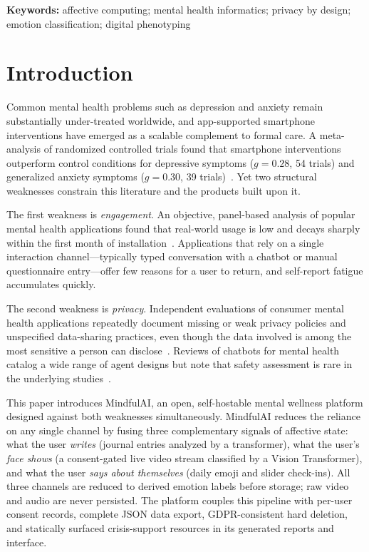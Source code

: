 \documentclass[11pt,a4paper]{article}
\newcommand{\system}{MindfulAI}
\begin{document}
\vspace{4pt}
\noindent\textbf{Keywords:} affective computing; mental health informatics; privacy by design; emotion classification; digital phenotyping

\vspace{6pt}

\section{Introduction}\label{sec:intro}

Common mental health problems such as depression and anxiety remain substantially under-treated worldwide, and app-supported smartphone interventions have emerged as a scalable complement to formal care. A meta-analysis of randomized controlled trials found that smartphone interventions outperform control conditions for depressive symptoms ($g = 0.28$, 54 trials) and generalized anxiety symptoms ($g = 0.30$, 39 trials)~\cite{linardon2019}. Yet two structural weaknesses constrain this literature and the products built upon it.

The first weakness is \emph{engagement}. An objective, panel-based analysis of popular mental health applications found that real-world usage is low and decays sharply within the first month of installation~\cite{baumel2019}. Applications that rely on a single interaction channel---typically typed conversation with a chatbot or manual questionnaire entry---offer few reasons for a user to return, and self-report fatigue accumulates quickly.

The second weakness is \emph{privacy}. Independent evaluations of consumer mental health applications repeatedly document missing or weak privacy policies and unspecified data-sharing practices, even though the data involved is among the most sensitive a person can disclose~\cite{lagan2020}. Reviews of chatbots for mental health catalog a wide range of agent designs but note that safety assessment is rare in the underlying studies~\cite{abdalrazaq2019,abdalrazaq2020}.

This paper introduces \system{}, an open, self-hostable mental wellness platform designed against both weaknesses simultaneously. \system{} reduces the reliance on any single channel by fusing three complementary signals of affective state: what the user \emph{writes} (journal entries analyzed by a transformer), what the user's \emph{face shows} (a consent-gated live video stream classified by a Vision Transformer), and what the user \emph{says about themselves} (daily emoji and slider check-ins). All three channels are reduced to derived emotion labels before storage; raw video and audio are never persisted. The platform couples this pipeline with per-user consent records, complete JSON data export, GDPR-consistent hard deletion, and statically surfaced crisis-support resources in its generated reports and interface.
\end{document}
